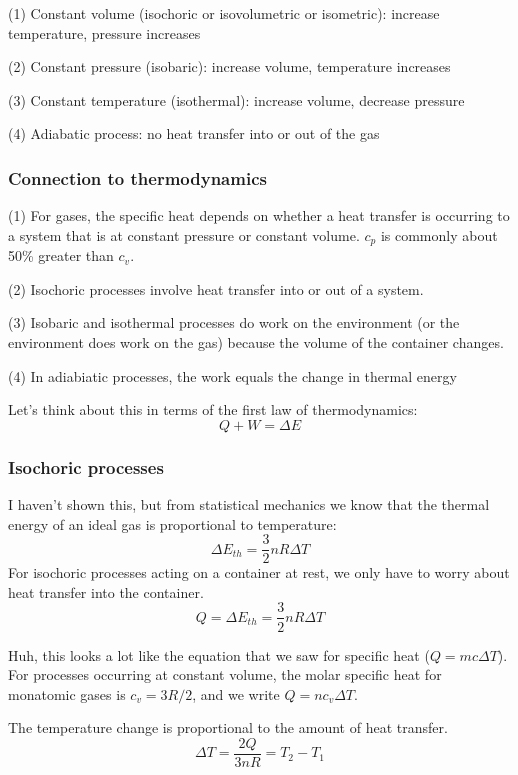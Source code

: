 (1) Constant volume (isochoric or isovolumetric or isometric): increase temperature, pressure increases

(2) Constant pressure (isobaric): increase volume, temperature increases

(3) Constant temperature (isothermal): increase volume, decrease pressure

(4) Adiabatic process: no heat transfer into or out of the gas

\vspace{5cm}


\subsubsection{Connection to thermodynamics}
(1) For gases, the specific heat depends on whether a heat transfer is occurring to a system that is at constant pressure or constant volume. $c_p$ is commonly about 50\% greater than $c_v$.

(2) Isochoric processes involve heat transfer into or out of a system.

(3) Isobaric and isothermal processes do work on the environment (or the environment does work on the gas) because the volume of the container changes.

(4) In adiabiatic processes, the work equals the change in thermal energy

Let's think about this in terms of the first law of thermodynamics:
$$Q+W=\Delta{E}$$

\subsubsection{Isochoric processes}
I haven't shown this, but from statistical mechanics we know that the thermal energy of an ideal gas is proportional to temperature:
$$\Delta{E_{th}}=\frac{3}{2}nR\Delta T$$
For isochoric processes acting on a container at rest, we only have to worry about heat transfer into the container.
$$Q=\Delta{E_{th}}=\frac{3}{2}nR\Delta T$$

Huh, this looks a lot like the equation that we saw for specific heat ($Q=mc\Delta{T}$). For processes occurring at constant volume, the molar specific heat for monatomic gases is $c_v=3R/2$, and we write $Q=nc_v\Delta{T}$.

The temperature change is proportional to the amount of heat transfer.
$$\Delta{T}=\frac{2Q}{3nR}=T_2-T_1$$

